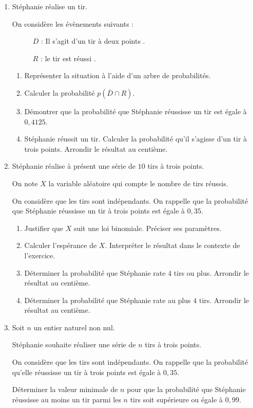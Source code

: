 \documentclass[10pt]{article}
\begin{document}
\begin{enumerate}
\item Stéphanie réalise un tir. 

On considère les évènements suivants :

\begin{description}
\item[ ] $D$ : \og Il s'agit d'un tir à deux points \fg.
\item[ ] $R$ : \og le tir est réussi \fg.
\end{description}
	\begin{enumerate}
		\item Représenter la situation à l'aide d'un arbre de probabilités.
		\item Calculer la probabilité $p\left(\overline{D} \cap R\right)$.
		\item Démontrer que la probabilité que Stéphanie réussisse un tir est égale à $0,4125$.
		\item Stéphanie réussit un tir. Calculer la probabilité qu'il s'agisse d'un tir à trois points. Arrondir le résultat au centième.
	\end{enumerate}	
\item Stéphanie réalise à présent une série de $10$ tirs à trois points.

On note $X$ la variable aléatoire qui compte le nombre de tirs réussis.

On considère que les tirs sont indépendants. On rappelle que la probabilité que Stéphanie réussisse un tir à trois points est égale à $0,35$.
	\begin{enumerate}
		\item Justifier que $X$ suit une loi binomiale. Préciser ses paramètres.
		\item Calculer l'espérance de $X$. Interpréter le résultat dans le contexte de l'exercice.
		\item Déterminer la probabilité que Stéphanie rate $4$ tirs ou plus. Arrondir le résultat au centième.
		\item Déterminer la probabilité que Stéphanie rate au plus $4$ tirs. Arrondir le résultat au centième.
	\end{enumerate}
\item Soit $n$ un entier naturel non nul.

Stéphanie souhaite réaliser une série de $n$ tirs à trois points. 

On considère que les tirs sont indépendants. On rappelle que la probabilité qu'elle réussisse un tir à trois points est égale à $0,35$.

Déterminer la valeur minimale de $n$ pour que la probabilité que Stéphanie réussisse au moins un tir parmi les $n$ tirs soit supérieure ou égale à $0,99$.
\end{enumerate}

\bigskip
\end{document}
